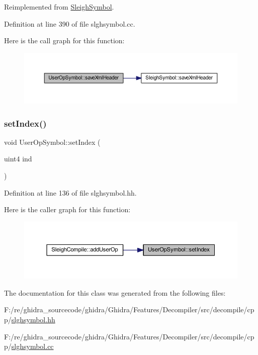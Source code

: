 Reimplemented from \mbox{\hyperlink{class_sleigh_symbol_ac501be7c584bc0568c29fb95910962e9}{Sleigh\+Symbol}}.



Definition at line 390 of file slghsymbol.\+cc.

Here is the call graph for this function\+:
\nopagebreak
\begin{figure}[H]
\begin{center}
\leavevmode
\includegraphics[width=350pt]{class_user_op_symbol_ae799003f975f31055383301b15c6cf0f_cgraph}
\end{center}
\end{figure}
\mbox{\label{class_user_op_symbol_a7a2c2ff33ed1eb44a58e0774aa5d8f7e}} 
\subsubsection{\texorpdfstring{setIndex()}{setIndex()}}
{\footnotesize\ttfamily void User\+Op\+Symbol\+::set\+Index (\begin{DoxyParamCaption}\item[{uint4}]{ind }\end{DoxyParamCaption})\hspace{0.3cm}{\ttfamily [inline]}}



Definition at line 136 of file slghsymbol.\+hh.

Here is the caller graph for this function\+:
\nopagebreak
\begin{figure}[H]
\begin{center}
\leavevmode
\includegraphics[width=350pt]{class_user_op_symbol_a7a2c2ff33ed1eb44a58e0774aa5d8f7e_icgraph}
\end{center}
\end{figure}


The documentation for this class was generated from the following files\+:\begin{DoxyCompactItemize}
\item 
F\+:/re/ghidra\+\_\+sourcecode/ghidra/\+Ghidra/\+Features/\+Decompiler/src/decompile/cpp/\mbox{\hyperlink{slghsymbol_8hh}{slghsymbol.\+hh}}\item 
F\+:/re/ghidra\+\_\+sourcecode/ghidra/\+Ghidra/\+Features/\+Decompiler/src/decompile/cpp/\mbox{\hyperlink{slghsymbol_8cc}{slghsymbol.\+cc}}\end{DoxyCompactItemize}
